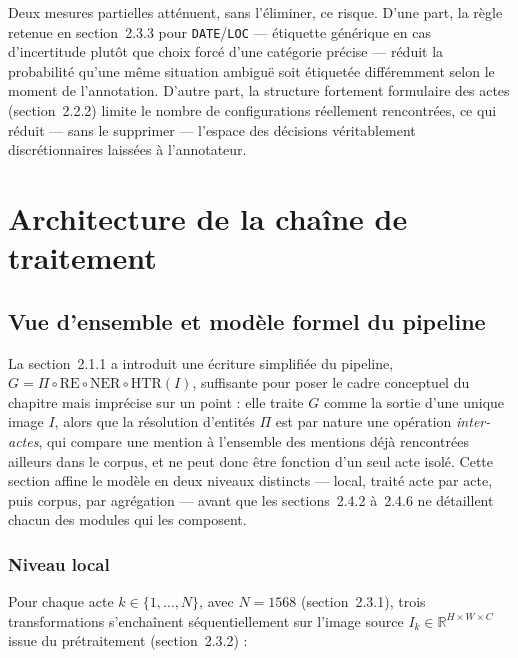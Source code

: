 Deux mesures partielles atténuent, sans l'éliminer, ce risque.
D'une part, la règle retenue en section~2.3.3 pour \texttt{DATE}/\texttt{LOC} --- étiquette générique en cas d'incertitude plutôt que choix forcé d'une catégorie précise --- réduit la probabilité qu'une même situation ambiguë soit étiquetée différemment selon le moment de l'annotation.
D'autre part, la structure fortement formulaire des actes (section~2.2.2) limite le nombre de configurations réellement rencontrées, ce qui réduit --- sans le supprimer --- l'espace des décisions véritablement discrétionnaires laissées à l'annotateur.


\section{Architecture de la chaîne de traitement}

\subsection{Vue d'ensemble et modèle formel du pipeline}

La section~2.1.1 a introduit une écriture simplifiée du pipeline, $G = \Pi \circ \mathrm{RE} \circ \mathrm{NER} \circ \mathrm{HTR}(I)$, suffisante pour poser le cadre conceptuel du chapitre mais imprécise sur un point : elle traite $G$ comme la sortie d'une unique image $I$, alors que la résolution d'entités $\Pi$ est par nature une opération \emph{inter-actes}, qui compare une mention à l'ensemble des mentions déjà rencontrées ailleurs dans le corpus, et ne peut donc être fonction d'un seul acte isolé.
Cette section affine le modèle en deux niveaux distincts --- local, traité acte par acte, puis corpus, par agrégation --- avant que les sections~2.4.2 à~2.4.6 ne détaillent chacun des modules qui les composent.

\subsubsection*{Niveau local}

Pour chaque acte $k \in \{1,\dots,N\}$, avec $N=1568$ (section~2.3.1), trois
transformations s'enchaînent séquentiellement sur l'image source $I_k \in
    \mathbb{R}^{H\times W \times C}$ issue du prétraitement (section~2.3.2) :

